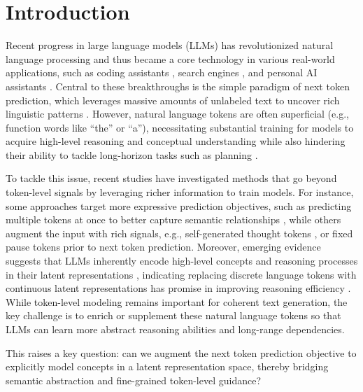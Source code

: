 \documentclass[]{fairmeta}
\title{\llname}
\author[1,2,\dagger]{Jihoon Tack}
\author[1]{Jack Lanchantin}
\author[1]{Jane Yu}
\author[1]{Andrew Cohen}
\author[1]{Ilia Kulikov}
\author[1]{Janice Lan}
\author[1,3,\dagger]{Shibo Hao}
\author[1]{Yuandong Tian}
\author[1]{Jason Weston}
\author[1]{Xian Li}
\affiliation[1]{FAIR at Meta}
\affiliation[2]{KAIST}
\affiliation[3]{UC San Diego}
\date{\today}
\begin{document}
\maketitle

\section{Introduction}
\label{sec:intro}


Recent progress in large language models (LLMs) has revolutionized natural language processing \citep{brown2020language,dubey2024llama} and thus became a core technology in various real-world applications, such as coding assistants \citep{roziere2023code}, search engines \citep{xuan2023evaluation}, and personal AI assistants \citep{gao2023assistgpt}. Central to these breakthroughs is the simple paradigm of next token prediction, which leverages massive amounts of unlabeled text to uncover rich linguistic patterns \citep{radford2018improving,radford2019language}. However, natural language tokens are often superficial (e.g., function words like ``the'' or ``a''), necessitating substantial training for models to acquire high-level reasoning and conceptual understanding while also hindering their ability to tackle long-horizon tasks such as planning \citep{lecun2022path,bachmann2024pitfalls}.

To tackle this issue, recent studies have investigated methods that go beyond token-level signals by leveraging richer information to train models. For instance, some approaches target more expressive prediction objectives, such as predicting multiple tokens at once to better capture semantic relationships \citep{gloeckle2024better,liu2024deepseek}, while others augment the input with rich signals, e.g., self-generated thought tokens \citep{zelikman2024quiet}, or fixed pause tokens \citep{goyal2024think} prior to next token prediction. Moreover, emerging evidence suggests that LLMs inherently encode high-level concepts and reasoning processes in their latent representations \citep{deng2023implicit,yang2024large}, indicating replacing discrete language tokens with continuous latent representations has promise in improving reasoning efficiency \citep{hao2024training}. While token-level modeling remains important for coherent text generation, the key challenge is to enrich or supplement these natural language tokens so that LLMs can learn more abstract reasoning abilities and long-range dependencies.

This raises a key question: can we augment the next token prediction objective to explicitly model concepts in a latent representation space, thereby bridging semantic abstraction and fine-grained token-level guidance?
\end{document}
